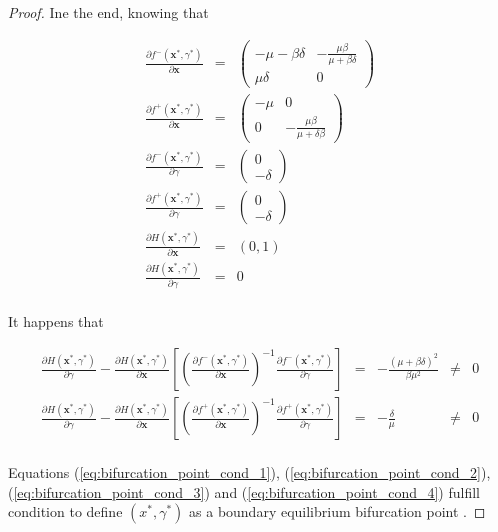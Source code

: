\begin{proof}
Ine the end, knowing that 

\begin{equation}
    \begin{array}{ccc}
        \frac{\partial f^-(\textbf{x}^*,\gamma^*)}{\partial \textbf{x}} &=& \begin{pmatrix}
        -\mu-\beta\delta & -\frac{\mu\beta}{\mu+\beta\delta} \\
        \mu\delta & 0 \end{pmatrix} \\
        \frac{\partial f^+(\textbf{x}^*,\gamma^*)}{\partial \textbf{x}} &=& \begin{pmatrix}
        -\mu & 0 \\ 0 & -\frac{\mu\beta}{\mu+\delta\beta} \end{pmatrix} \\
        \frac{\partial f^-(\textbf{x}^*,\gamma^*)}{\partial\gamma} &=& \begin{pmatrix} 0 \\ -\delta \end{pmatrix} \\
        \frac{\partial f^+(\textbf{x}^*,\gamma^*)}{\partial\gamma} &=& \begin{pmatrix} 0 \\ -\delta \end{pmatrix} \\
        \frac{\partial H(\textbf{x}^*,\gamma^*)}{\partial \textbf{x}} &=& (0,1) \\
        \frac{\partial H(\textbf{x}^*,\gamma^*)}{\partial \gamma} &=& 0 \\
    \end{array}
\end{equation}

It happens that

\begin{equation}
\label{eq:bifurcation_point_cond_4}
    \begin{array}{ccccc}
        \frac{\partial H(\textbf{x}^*,\gamma^*)}{\partial \gamma} - \frac{\partial H(\textbf{x}^*,\gamma^*)}{\partial \textbf{x}} \left[\left(\frac{\partial f^-(\textbf{x}^*,\gamma^*)}{\partial\textbf{x}}\right)^{-1}\frac{\partial f^-(\textbf{x}^*,\gamma^*)}{\partial\gamma}
        \right] &=& -\frac{\left(\mu+\beta\delta\right)^2}{\beta\mu^2} & \neq & 0 \\
        \frac{\partial H(\textbf{x}^*,\gamma^*)}{\partial \gamma} - \frac{\partial H(\textbf{x}^*,\gamma^*)}{\partial \textbf{x}} \left[\left(\frac{\partial f^+(\textbf{x}^*,\gamma^*)}{\partial\textbf{x}}\right)^{-1}\frac{\partial f^+(\textbf{x}^*,\gamma^*)}{\partial\gamma}
        \right] &=& -\frac{\delta}{\mu} & \neq & 0 \\ 
    \end{array}
\end{equation}

Equations (\ref{eq:bifurcation_point_cond_1}), (\ref{eq:bifurcation_point_cond_2}), (\ref{eq:bifurcation_point_cond_3}) and (\ref{eq:bifurcation_point_cond_4}) fulfill condition to define $(x^*,\gamma^*)$ as a boundary equilibrium bifurcation point \cite[pp. 235]{bib:di_bernardo}.
\end{proof}